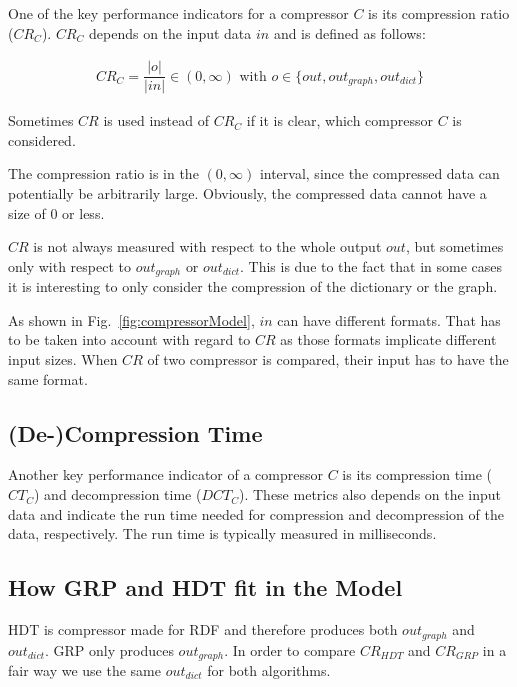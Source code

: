 One of the key performance indicators for a compressor $C$ is its compression ratio ($CR_C$). $CR_C$ depends on the input data $in$ and is defined as follows:

\begin{align*}
CR_{C} = \dfrac{|o|}{ |in|} \in (0,\infty) \text{ with } o\in \{out,out_{graph},out_{dict} \}
\end{align*}

Sometimes $CR$ is used instead of $CR_C$ if it is clear, which compressor $C$ is considered.

The compression ratio is in the $(0,\infty)$ interval, since the compressed data can potentially be arbitrarily large. Obviously, the compressed data cannot have a size of 0 or less.

$CR$ is not always measured with respect to the whole output $out$, but sometimes only with respect to $out_{graph} \text{ or } out_{dict}$. This is due to the fact that in some cases it is interesting to only consider the compression of the dictionary or the graph.

As shown in Fig.~\ref{fig:compressorModel}, $in$ can have different formats. That has to be taken into account with regard to $CR$ as those formats implicate different input sizes. When $CR$ of two compressor is compared, their input has to have the same format.

\subsection{(De-)Compression Time}

Another key performance indicator of a compressor $C$ is its compression time ($CT_C$) and decompression time ($DCT_C$). These metrics also depends on the input data and indicate the run time needed for compression and decompression of the data, respectively. The run time is typically measured in milliseconds.

\subsection{How GRP and HDT fit in the Model}

HDT is compressor made for RDF and therefore produces both  $out_{graph}$ and $out_{dict}$. GRP only produces  $out_{graph}$. In order to compare $CR_{HDT}$ and $CR_{GRP}$ in a fair way we use the same $out_{dict}$ for both algorithms.

